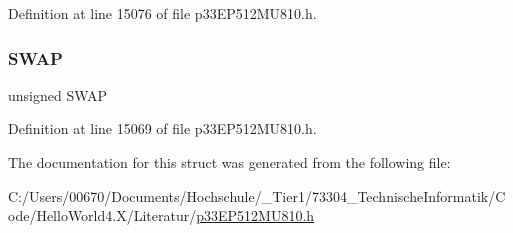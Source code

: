 Definition at line 15076 of file p33\+E\+P512\+M\+U810.\+h.

\mbox{\label{structtag_i_o_c_o_n5_b_i_t_s_a3ed0654ceb192d32e26d2929c9b8dcc2}} 
\subsubsection{\texorpdfstring{S\+W\+AP}{SWAP}}
{\footnotesize\ttfamily unsigned S\+W\+AP}



Definition at line 15069 of file p33\+E\+P512\+M\+U810.\+h.



The documentation for this struct was generated from the following file\+:\begin{DoxyCompactItemize}
\item 
C\+:/\+Users/00670/\+Documents/\+Hochschule/\+\_\+\+Tier1/73304\+\_\+\+Technische\+Informatik/\+Code/\+Hello\+World4.\+X/\+Literatur/\hyperlink{p33_e_p512_m_u810_8h}{p33\+E\+P512\+M\+U810.\+h}\end{DoxyCompactItemize}
